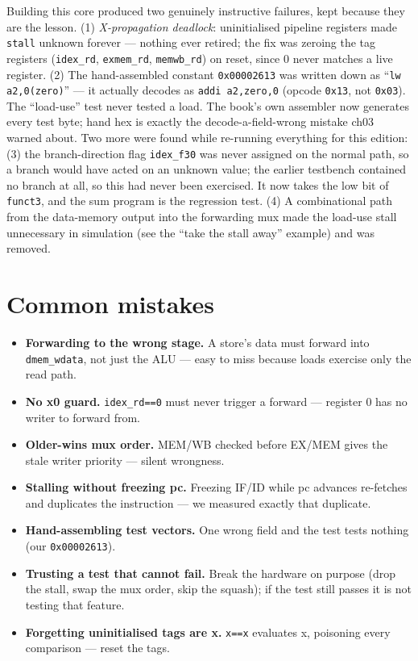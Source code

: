 \begin{example}\label{ex:bugs07}
Building this core produced two genuinely instructive failures,
kept because they are the lesson. (1) \emph{X-propagation deadlock}:
uninitialised pipeline registers made \texttt{stall} unknown
forever --- nothing ever retired; the fix was zeroing the tag
registers (\texttt{idex\_rd}, \texttt{exmem\_rd}, \texttt{memwb\_rd})
on reset, since 0 never matches a live register. (2) The
hand-assembled constant \texttt{0x00002613} was written down as
``\texttt{lw a2,0(zero)}'' --- it actually decodes as
\texttt{addi a2,zero,0} (opcode \texttt{0x13}, not \texttt{0x03}).
The ``load-use'' test never tested a load. The book's own assembler
now generates every test byte; hand hex is exactly the
decode-a-field-wrong mistake ch03 warned about. Two more were found
while re-running everything for this edition: (3) the branch-direction
flag \texttt{idex\_f30} was never assigned on the normal path, so a
branch would have acted on an unknown value; the earlier testbench
contained no branch at all, so this had never been exercised. It now
takes the low bit of \texttt{funct3}, and the sum program is the
regression test. (4) A combinational path from the data-memory output
into the forwarding mux made the load-use stall unnecessary in
simulation (see the ``take the stall away'' example) and was removed.
\end{example}

\section{Common mistakes}
\label{sec:mistakes07}
\begin{itemize}
\item \textbf{Forwarding to the wrong stage.} A store's data must
      forward into \texttt{dmem\_wdata}, not just the ALU --- easy to
      miss because loads exercise only the read path.
\item \textbf{No x0 guard.} \texttt{idex\_rd==0} must never trigger
      a forward --- register 0 has no writer to forward from.
\item \textbf{Older-wins mux order.} MEM/WB checked before EX/MEM
      gives the stale writer priority --- silent wrongness.
\item \textbf{Stalling without freezing pc.} Freezing IF/ID while
      pc advances re-fetches and duplicates the instruction ---
      we measured exactly that duplicate.
\item \textbf{Hand-assembling test vectors.} One wrong field and
      the test tests nothing (our \texttt{0x00002613}).
\item \textbf{Trusting a test that cannot fail.} Break the hardware
      on purpose (drop the stall, swap the mux order, skip the squash);
      if the test still passes it is not testing that feature.
\item \textbf{Forgetting uninitialised tags are x.} \texttt{x==x}
      evaluates x, poisoning every comparison --- reset the tags.
\end{itemize}

